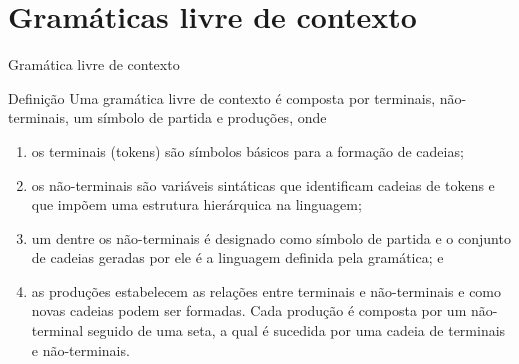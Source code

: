 \section{Gramáticas livre de contexto}

\begin{frame}[fragile]{Gramática livre de contexto}

    \begin{block}{Definição}
        Uma gramática livre de contexto é composta por terminais, não-terminais, um símbolo de partida e produções, onde
        \begin{enumerate}
            \item os terminais (tokens) são símbolos básicos para a formação de cadeias;
            \item os não-terminais são variáveis sintáticas que identificam cadeias de tokens e que impõem uma estrutura hierárquica na linguagem;
            \item um dentre os não-terminais é designado como símbolo de partida e o conjunto de cadeias geradas por ele é a linguagem definida pela gramática; e
            \item as produções estabelecem as relações entre terminais e não-terminais e como novas cadeias podem ser formadas. Cada produção é composta por um
                não-terminal seguido de uma seta, a qual é sucedida por uma cadeia de terminais e não-terminais.
        \end{enumerate}
    \end{block}

\end{frame}

